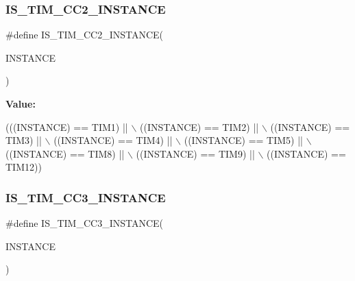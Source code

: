 \subsubsection{\texorpdfstring{I\+S\+\_\+\+T\+I\+M\+\_\+\+C\+C2\+\_\+\+I\+N\+S\+T\+A\+N\+CE}{IS\_TIM\_CC2\_INSTANCE}}
{\footnotesize\ttfamily \#define I\+S\+\_\+\+T\+I\+M\+\_\+\+C\+C2\+\_\+\+I\+N\+S\+T\+A\+N\+CE(\begin{DoxyParamCaption}\item[{}]{I\+N\+S\+T\+A\+N\+CE }\end{DoxyParamCaption})}

{\bfseries Value\+:}
\begin{DoxyCode}
(((INSTANCE) == TIM1) || \(\backslash\)
                                       ((INSTANCE) == TIM2) || \(\backslash\)
                                       ((INSTANCE) == TIM3) || \(\backslash\)
                                       ((INSTANCE) == TIM4) || \(\backslash\)
                                       ((INSTANCE) == TIM5) || \(\backslash\)
                                       ((INSTANCE) == TIM8) || \(\backslash\)
                                       ((INSTANCE) == TIM9) || \(\backslash\)
                                       ((INSTANCE) == TIM12))
\end{DoxyCode}
\mbox{\label{group___exported__macros_ga0c37cb8f925fd43622cce7a4c00fd95e}} 
\subsubsection{\texorpdfstring{I\+S\+\_\+\+T\+I\+M\+\_\+\+C\+C3\+\_\+\+I\+N\+S\+T\+A\+N\+CE}{IS\_TIM\_CC3\_INSTANCE}}
{\footnotesize\ttfamily \#define I\+S\+\_\+\+T\+I\+M\+\_\+\+C\+C3\+\_\+\+I\+N\+S\+T\+A\+N\+CE(\begin{DoxyParamCaption}\item[{}]{I\+N\+S\+T\+A\+N\+CE }\end{DoxyParamCaption})}

